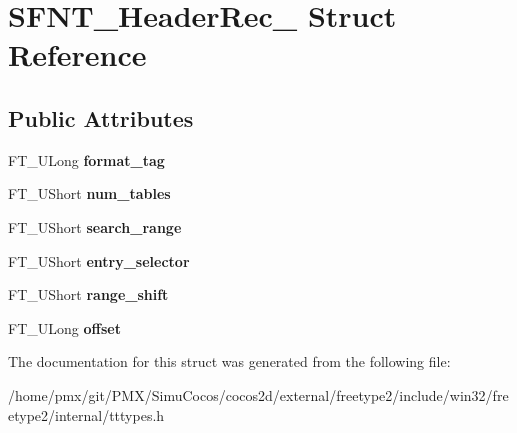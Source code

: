 \hypertarget{structSFNT__HeaderRec__}{}\section{S\+F\+N\+T\+\_\+\+Header\+Rec\+\_\+ Struct Reference}
\label{structSFNT__HeaderRec__}
\subsection*{Public Attributes}
\begin{DoxyCompactItemize}
\item 
\mbox{\label{structSFNT__HeaderRec___ad59d649b189ab19fae02341e95e02448}} 
F\+T\+\_\+\+U\+Long {\bfseries format\+\_\+tag}
\item 
\mbox{\label{structSFNT__HeaderRec___a46d8d8bf8f2d8b6536eb5fa5704852e2}} 
F\+T\+\_\+\+U\+Short {\bfseries num\+\_\+tables}
\item 
\mbox{\label{structSFNT__HeaderRec___a39ca0e21eaec6be602547bb2ed898d5d}} 
F\+T\+\_\+\+U\+Short {\bfseries search\+\_\+range}
\item 
\mbox{\label{structSFNT__HeaderRec___ada628a85486eb034abd56b872ecdcd78}} 
F\+T\+\_\+\+U\+Short {\bfseries entry\+\_\+selector}
\item 
\mbox{\label{structSFNT__HeaderRec___aa2a39db194a8a9a0cc8504143ac4f5c1}} 
F\+T\+\_\+\+U\+Short {\bfseries range\+\_\+shift}
\item 
\mbox{\label{structSFNT__HeaderRec___a04f99ce2ff335f8702a4edf7132a3e04}} 
F\+T\+\_\+\+U\+Long {\bfseries offset}
\end{DoxyCompactItemize}


The documentation for this struct was generated from the following file\+:\begin{DoxyCompactItemize}
\item 
/home/pmx/git/\+P\+M\+X/\+Simu\+Cocos/cocos2d/external/freetype2/include/win32/freetype2/internal/tttypes.\+h\end{DoxyCompactItemize}

